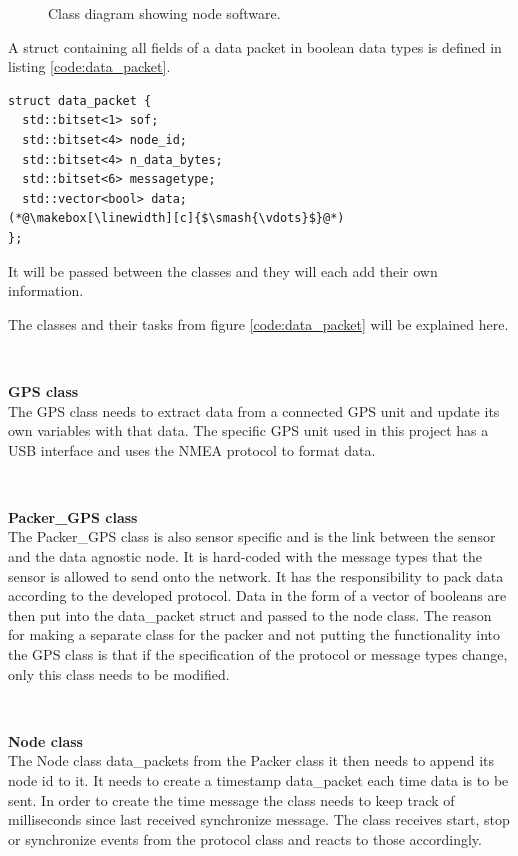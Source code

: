 \begin{figure}[!h]
\centering
{}
\caption{Class diagram showing node software.}
\label{fig:node_class_diagram}
\end{figure}

A struct containing all fields of a data packet in boolean data types is defined in listing \ref{code:data_packet}.  

\begin{lstlisting}[caption=Struct for data packet.,label=code:data_packet]
struct data_packet {
  std::bitset<1> sof;
  std::bitset<4> node_id;
  std::bitset<4> n_data_bytes;
  std::bitset<6> messagetype;
  std::vector<bool> data;
(*@\makebox[\linewidth][c]{$\smash{\vdots}$}@*)
};
\end{lstlisting}
It will be passed between the classes and they will each add their own information. 

The classes and their tasks from figure \ref{code:data_packet} will be explained here.


~\\ \par \textbf{GPS class} ~ \\
The GPS class needs to extract data from a connected GPS unit and update its own variables with that data.
The specific GPS unit used in this project has a USB interface and uses the NMEA protocol to format data.

~\\ \par \textbf{Packer\_GPS class} ~ \\
The Packer\_GPS class is also sensor specific and is the link between the sensor and the data agnostic node.
It is hard-coded with the message types that the sensor is allowed to send onto the network.
It has the responsibility to pack data according to the developed protocol.
Data in the form of a vector of booleans are then put into the data\_packet struct and passed to the node class.
The reason for making a separate class for the packer and not putting the functionality into the GPS class is that if the specification of the protocol or message types change, only this class needs to be modified.

~\\ \par \textbf{Node class} ~ \\
The Node class data\_packets from the Packer class it then needs to append its node id to it.
It needs to create a timestamp data\_packet each time data is to be sent.
In order to create the time message the class needs to keep track of milliseconds since last received synchronize message.
The class receives start, stop or synchronize events from the protocol class and reacts to those accordingly.

